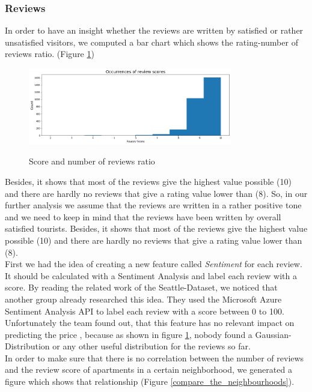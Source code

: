 \documentclass[journal]{IEEEtran}
\begin{document}
\subsubsection{Reviews}
%
In order to have an insight whether the reviews are written by satisfied or rather unsatisfied visitors, we computed a bar chart which shows the rating-number of reviews ratio. (Figure \ref{score_reviews_ratio})
%
\begin{figure}
  \begin{center}
  \includegraphics[width=3.5in]{photo/2_1_occurences_of_review_scores.png}\\
  \caption{Score and number of reviews ratio}\label{score_reviews_ratio}
  \end{center}
\end{figure}
%
Besides, it shows that most of the reviews give the highest value possible (10) and there are hardly no reviews that give a rating value lower than (8). So, in our further analysis we assume that the reviews are written in a rather positive tone and we need to keep in mind that the reviews have been written by overall satisfied tourists. Besides, it shows that most of the reviews give the highest value possible (10) and there are hardly no reviews that give a rating value lower than (8).\\ First we had the idea of creating a new feature called \textit{Sentiment} for each review. It should be calculated with a Sentiment Analysis and label each review with a score. By reading the related work of the Seattle-Dataset, we noticed that another group already researched this idea. They used the Microsoft Azure Sentiment Analysis API to label each review with a score between 0 to 100. Unfortunately the team found out, that this feature has no relevant impact on predicting the price \cite{RN1}, because as shown in figure \ref{score_reviews_ratio}, nobody found a Gaussian-Distribution or any other useful distribution for the reviews so far.\\
In order to make sure that there is no correlation between the number of reviews and the review score of apartments in a certain neighborhood, we generated a figure which shows that relationship (Figure \ref{compare_the_neighbourhoods}). \\
\end{document}
